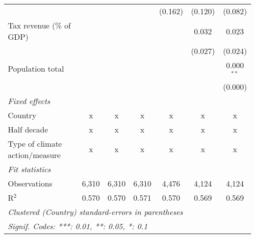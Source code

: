 \begin{tabular}{lcccccc}
                                                    &         &                &                & (0.162)        & (0.120)        & (0.082)\\   
   Tax revenue (\% of GDP)                          &         &                &                &                & 0.032          & 0.023\\   
                                                    &         &                &                &                & (0.027)        & (0.024)\\   
   Population total                                 &         &                &                &                &                & 0.000$^{**}$\\   
                                                    &         &                &                &                &                & (0.000)\\   
   \emph{Fixed effects}\\
   Country                                          & x       & x              & x              & x              & x              & x\\  
   Half decade                                      & x       & x              & x              & x              & x              & x\\  
   Type of climate action/measure                   & x       & x              & x              & x              & x              & x\\  
   \midrule \emph{Fit statistics}\\
   Observations                                     & 6,310   & 6,310          & 6,310          & 4,476          & 4,124          & 4,124\\  
   R$^2$                                            & 0.570   & 0.570          & 0.571          & 0.570          & 0.569          & 0.569\\  
   \midrule
   \multicolumn{7}{l}{\emph{Clustered (Country) standard-errors in parentheses}}\\
   \multicolumn{7}{l}{\emph{Signif. Codes: ***: 0.01, **: 0.05, *: 0.1}}\\
\end{tabular}
\par\endgroup


